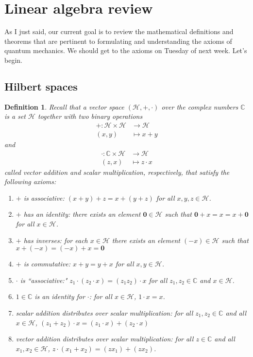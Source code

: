 \documentclass{article}
\newtheorem*{dfn}{Definition}
\newcommand{\bbC}{\mathbb{C}}
\newcommand{\calH}{\mathcal{H}}
\begin{document}
\section{Linear algebra review}
As I just said, our current goal is to review the mathematical definitions and theorems that are pertinent to formulating and understanding the axioms of quantum mechanics.  We should get to the axioms on Tuesday of next week.  Let's begin.

\subsection{Hilbert spaces}
\begin{dfn} Recall that a \emph{vector space} $(\mathcal{H},+,\cdot)$ over the complex numbers $\mathbb{C}$ is a set $\mathcal{H}$ together with two binary operations
	\[\begin{aligned}
	+: \calH \times \calH &\to \calH\\
	(x,y) &\mapsto x+y
	\end{aligned}\]
and
	\[\begin{aligned}
	\cdot: \bbC \times \calH &\to \calH \\
	(z,x) &\mapsto z\cdot x
	\end{aligned}\]
called \emph{vector addition} and \emph{scalar multiplication}, respectively, that satisfy the following axioms:
\begin{enumerate}
	\item $+$ is associative: $(x+y)+z = x+(y+z)$ for all $x,y,z \in \calH$.
	\item $+$ has an identity: there exists an element $\mathbf{0} \in \calH$ such that $\mathbf{0}+x = x = x+\mathbf{0}$ for all $x \in \calH$.
	\item $+$ has inverses: for each $x \in \calH$ there exists an element $(-x) \in \calH$ such that $x+(-x) = (-x)+x = \mathbf{0}$
	\item $+$ is commutative: $x+y = y +x$ for all $x,y \in \calH$.
	\item $\cdot$ is ``associative:" $z_1\cdot(z_2\cdot x) = (z_1z_2)\cdot x$ for all $z_1,z_2 \in \bbC$ and $x \in \calH$.
	\item $1 \in \bbC$ is an identity for $\cdot$: for all $x \in \calH$, $1\cdot x = x$.
	\item scalar addition distributes over scalar multiplication: for all $z_1,z_2 \in \bbC$ and all $x \in \calH$, $(z_1+z_2)\cdot x = (z_1\cdot x) + (z_2\cdot x)$
	\item vector addition distributes over scalar multiplication: for all $z \in \bbC$ and all $x_1,x_2 \in \calH$, $z\cdot (x_1+x_2) = (zx_1) + (zx_2)$.
\end{enumerate}
\end{dfn}
\end{document}
